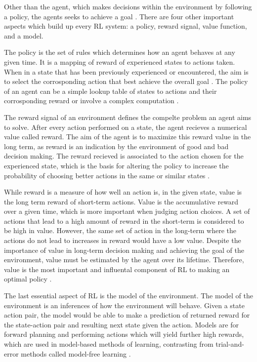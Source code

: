 Other than the agent, which makes decisions within the environment by following a policy, the agents seeks to achieve a goal \cite{Sutton1}. There are four other important aspects which build up every RL system: a policy, reward signal, value function, and a model.

The policy is the set of rules which determines how an agent behaves at any given time. It is a mapping of reward of experienced states to actions taken. When in a state that has been previously experienced or encountered, the aim is to select the corrosponding action that best achieve the overall goal \cite{GabrieleDe}. The policy of an agent can be a simple lookup table of states to actions and their corrosponding reward or involve a complex computation \cite{Sutton1}. 

The reward signal of an environment defines the compelte problem an agent aims to solve. After every action performed on a state, the agent recieves a numerical value called reward. The aim of the agent is to maximize this reward value in the long term, as reward is an indication by the environment of good and bad decision making. The reward recieved is associated to the action chosen for the experienced state, which is the basis for altering the policy to increase the probability of choosing better actions in the same or similar states \cite{Sutton1}. 

While reward is a measure of how well an action is, in the given state, value is the long term reward of short-term actions. Value is the accumulative reward over a given time, which is more important when judging action choices. A set of actions that lead to a high amount of reward in the short-term is considered to be high in value. However, the same set of action in the long-term where the actions do not lead to increases in reward would have a low value. Despite the importance of value in long-term decision making and achieving the goal of the environment, value must be estimated by the agent over its lifetime. Therefore, value is the most important and influental component of RL to making an optimal policy \cite{Sutton1}. 

The last essential aspect of RL is the model of the environment. The model of the environment is an inferences of how the environment will behave. Given a state action pair, the model would be able to make a prediction of returned reward for the state-action pair and resulting next state given the action. Models are for forward planning and performing actions which will yield further high rewards, which are used in model-based methods of learning, contrasting from trial-and-error methods called model-free learning \cite{Sutton1}.

